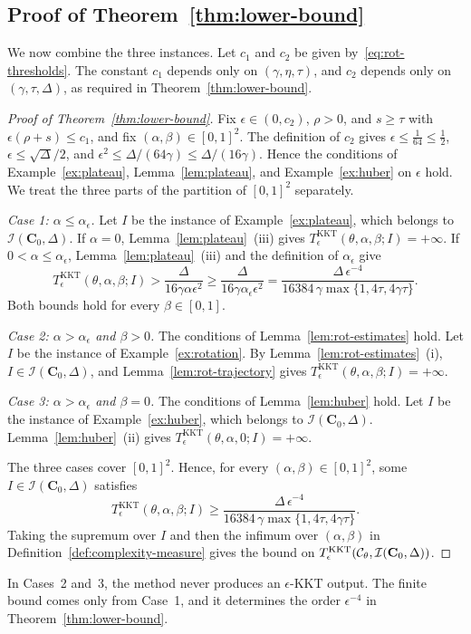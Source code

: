 \subsection{Proof of Theorem~\ref{thm:lower-bound}}
\label{subsec:lb-combine}

We now combine the three instances. Let \(c_1\) and \(c_2\) be given
by~\eqref{eq:rot-thresholds}. The constant \(c_1\) depends only on
\((\gamma,\eta,\tau)\), and \(c_2\) depends only on \((\gamma,\tau,\Delta)\),
as required in Theorem~\ref{thm:lower-bound}.

\begin{proof}[Proof of Theorem~\ref{thm:lower-bound}]
Fix \(\epsilon\in(0,c_2)\), \(\rho>0\), and \(s\ge\tau\) with
\(\epsilon(\rho+s)\le c_1\), and fix \((\alpha,\beta)\in[0,1]^2\). The
definition of \(c_2\) gives \(\epsilon\le\frac1{64}\le\frac12\),
\(\epsilon\le\sqrt\Delta/2\), and
\(\epsilon^2\le\Delta/(64\gamma)\le\Delta/(16\gamma)\). Hence the conditions
of Example~\ref{ex:plateau}, Lemma~\ref{lem:plateau}, and
Example~\ref{ex:huber} on \(\epsilon\) hold. We treat the three parts of the
partition of \([0,1]^2\) separately.

\emph{Case 1: \(\alpha\le\alpha_\epsilon\).} Let \(I\) be the instance of
Example~\ref{ex:plateau}, which belongs to \(\mathcal I(\mathbf C_0,\Delta)\).
If \(\alpha=0\), Lemma~\ref{lem:plateau}~(iii) gives
\(T^{\mathrm{KKT}}_\epsilon(\theta,\alpha,\beta;I)=+\infty\). If
\(0<\alpha\le\alpha_\epsilon\), Lemma~\ref{lem:plateau}~(iii) and the
definition of \(\alpha_\epsilon\) give
\[
T^{\mathrm{KKT}}_\epsilon(\theta,\alpha,\beta;I)
>\frac{\Delta}{16\gamma\alpha\epsilon^2}
\ge\frac{\Delta}{16\gamma\alpha_\epsilon\epsilon^2}
=\frac{\Delta\,\epsilon^{-4}}{16384\,\gamma\max\{1,4\tau,4\gamma\tau\}}.
\]
Both bounds hold for every \(\beta\in[0,1]\).

\emph{Case 2: \(\alpha>\alpha_\epsilon\) and \(\beta>0\).} The conditions of
Lemma~\ref{lem:rot-estimates} hold. Let \(I\) be the instance of
Example~\ref{ex:rotation}. By Lemma~\ref{lem:rot-estimates}~(i),
\(I\in\mathcal I(\mathbf C_0,\Delta)\), and Lemma~\ref{lem:rot-trajectory}
gives \(T^{\mathrm{KKT}}_\epsilon(\theta,\alpha,\beta;I)=+\infty\).

\emph{Case 3: \(\alpha>\alpha_\epsilon\) and \(\beta=0\).} The conditions of
Lemma~\ref{lem:huber} hold. Let \(I\) be the instance of
Example~\ref{ex:huber}, which belongs to \(\mathcal I(\mathbf C_0,\Delta)\).
Lemma~\ref{lem:huber}~(ii) gives
\(T^{\mathrm{KKT}}_\epsilon(\theta,\alpha,0;I)=+\infty\).

The three cases cover \([0,1]^2\). Hence, for every
\((\alpha,\beta)\in[0,1]^2\), some \(I\in\mathcal I(\mathbf C_0,\Delta)\)
satisfies
\[
T^{\mathrm{KKT}}_\epsilon(\theta,\alpha,\beta;I)
\ge\frac{\Delta\,\epsilon^{-4}}{16384\,\gamma\max\{1,4\tau,4\gamma\tau\}}.
\]
Taking the supremum over \(I\) and then the infimum over \((\alpha,\beta)\)
in Definition~\ref{def:complexity-measure} gives the bound on
\(T^{\mathrm{KKT}}_\epsilon(\mathcal{C}_\theta,\mathcal I(\mathbf C_0,\Delta))\).
\end{proof}

In Cases~2 and~3, the method never produces an \(\epsilon\)-KKT output.
The finite bound comes only from Case~1, and it determines the order
\(\epsilon^{-4}\) in Theorem~\ref{thm:lower-bound}.

